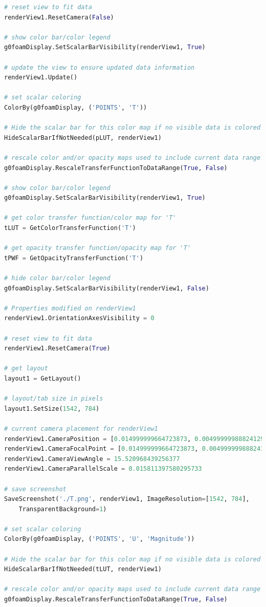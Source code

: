 \documentclass[12pt]{article}
\begin{document}
\begin{lstlisting}[language=python, caption=Script for the generation of images and data from the CFD results., label=lst:ppost]
# reset view to fit data
renderView1.ResetCamera(False)

# show color bar/color legend
g0foamDisplay.SetScalarBarVisibility(renderView1, True)

# update the view to ensure updated data information
renderView1.Update()

# set scalar coloring
ColorBy(g0foamDisplay, ('POINTS', 'T'))

# Hide the scalar bar for this color map if no visible data is colored by it.
HideScalarBarIfNotNeeded(pLUT, renderView1)

# rescale color and/or opacity maps used to include current data range
g0foamDisplay.RescaleTransferFunctionToDataRange(True, False)

# show color bar/color legend
g0foamDisplay.SetScalarBarVisibility(renderView1, True)

# get color transfer function/color map for 'T'
tLUT = GetColorTransferFunction('T')

# get opacity transfer function/opacity map for 'T'
tPWF = GetOpacityTransferFunction('T')

# hide color bar/color legend
g0foamDisplay.SetScalarBarVisibility(renderView1, False)

# Properties modified on renderView1
renderView1.OrientationAxesVisibility = 0

# reset view to fit data
renderView1.ResetCamera(True)

# get layout
layout1 = GetLayout()

# layout/tab size in pixels
layout1.SetSize(1542, 784)

# current camera placement for renderView1
renderView1.CameraPosition = [0.014999999664723873, 0.004999999888241291, 0.06109054909012853]
renderView1.CameraFocalPoint = [0.014999999664723873, 0.004999999888241291, 0.0]
renderView1.CameraViewAngle = 15.520968439256377
renderView1.CameraParallelScale = 0.015811397580295733

# save screenshot
SaveScreenshot('./T.png', renderView1, ImageResolution=[1542, 784],
    TransparentBackground=1)

# set scalar coloring
ColorBy(g0foamDisplay, ('POINTS', 'U', 'Magnitude'))

# Hide the scalar bar for this color map if no visible data is colored by it.
HideScalarBarIfNotNeeded(tLUT, renderView1)

# rescale color and/or opacity maps used to include current data range
g0foamDisplay.RescaleTransferFunctionToDataRange(True, False)


\end{lstlisting}
\end{document}
